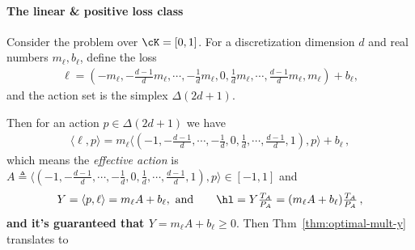 \paragraph{The linear \& positive loss class}
Consider the \olo problem over $\cK = [0, 1]$.
For a discretization dimension $d$
and real numbers $m_\ell, b_\ell$, define the loss
\begin{align*}
    \ell = (-m_\ell, -\tfrac{d-1}{d}m_\ell, \cdots,
    -\tfrac{1}{d}m_\ell, 0, \tfrac{1}{d}m_\ell, \cdots,
    \tfrac{d-1}{d} m_\ell, m_\ell) + b_\ell,
\end{align*}
and the action set is the simplex $\Delta(2d + 1)$.

Then for an action $p \in \Delta(2d + 1)$ we have
\begin{align*}
    \langle \ell, p\rangle = m_\ell
    \langle
    (-1, -\tfrac{d-1}{d}, \cdots, -\tfrac{1}{d},
    0, \tfrac{1}{d}, \cdots, \tfrac{d-1}{d}, 1)
    , p
    \rangle + b_\ell\,,
\end{align*}
which means the \textit{effective action} is
$
    A \triangleq
    \langle
    (-1, -\tfrac{d-1}{d}, \cdots, -\tfrac{1}{d},
    0, \tfrac{1}{d}, \cdots, \tfrac{d-1}{d}, 1)
    , p
    \rangle
    \in [-1, 1]
$ and
\begin{align*}
    Y = \langle p, \ell \rangle = m_\ell A + b_\ell,\,\,
    \text{and}
    \qquad
    \hl = Y \tfrac{T_A}{P_A} = (m_\ell A + b_\ell) \tfrac{T_A}{P_A}\,,
\end{align*}
\textbf{and it's guaranteed that $Y=m_\ell A + b_\ell \geq 0$}.
Then Thm~\ref{thm:optimal-mult-y} translates to
